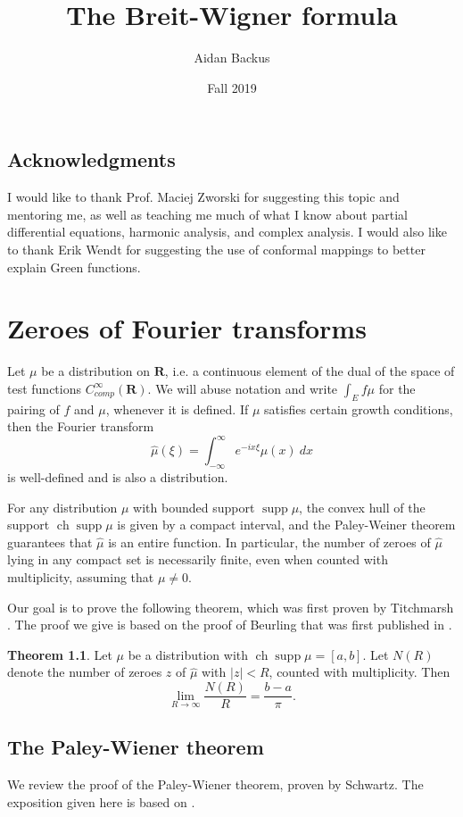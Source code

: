 \documentclass[12pt]{report}
\title{The Breit-Wigner formula}
\author{Aidan Backus}
\date{Fall 2019}
\newcommand{\RR}{\mathbf{R}}
\DeclareMathOperator{\ch}{ch}
\DeclareMathOperator{\supp}{supp}
\theoremstyle{definition}
\newtheorem{theorem}{Theorem}[chapter]
\begin{document}
\maketitle

\tableofcontents


\section*{Acknowledgments}
I would like to thank Prof. Maciej Zworski for suggesting this topic and mentoring me, as well as teaching me much of what I know about partial differential equations, harmonic analysis, and complex analysis. I would also like to thank Erik Wendt for suggesting the use of conformal mappings to better explain Green functions.



\chapter{Zeroes of Fourier transforms}
Let $\mu$ be a distribution on $\RR$, i.e. a continuous element of the dual of the space of test functions $C^\infty_{comp}(\RR)$. We will abuse notation and write $\int_E f\mu$ for the pairing of $f$ and $\mu$, whenever it is defined. If $\mu$ satisfies certain growth conditions, then the Fourier transform
$$\hat \mu(\xi) = \int_{-\infty}^\infty e^{-ix\xi} \mu(x) ~dx$$
is well-defined and is also a distribution.

For any distribution $\mu$ with bounded support $\supp \mu$, the convex hull of the support $\ch \supp \mu$ is given by a compact interval, and the Paley-Weiner theorem guarantees that $\hat \mu$ is an entire function. In particular, the number of zeroes of $\hat \mu$ lying in any compact set is necessarily finite, even when counted with multiplicity, assuming that $\mu \neq 0$.

Our goal is to prove the following theorem, which was first proven by Titchmarsh \cite{titchmarsh1926zeros}. The proof we give is based on the proof of Beurling that was first published in \cite[Chapter XVI]{hormander2004analysis}.
\begin{theorem}
    Let $\mu$ be a distribution with $\ch \supp \mu = [a, b]$. Let $N(R)$ denote the number of zeroes $z$ of $\hat \mu$ with $|z| < R$, counted with multiplicity. Then
    $$\lim_{R \to \infty} \frac{N(R)}{R} = \frac{b-a}{\pi}.$$
\end{theorem}

\section{The Paley-Wiener theorem}
We review the proof of the Paley-Wiener theorem, proven by Schwartz. The exposition given here is based on \cite[Chapter VII]{hormander2015analysis}.
\end{document}
